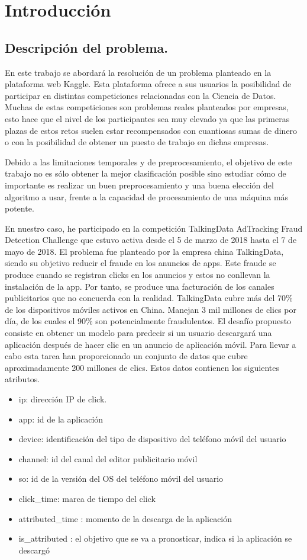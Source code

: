 \chapter[Introducción]{Introducción}
\section{Descripción del problema.}
En este trabajo se abordará la resolución de un problema planteado en la plataforma web Kaggle. Esta plataforma ofrece a sus usuarios la posibilidad de participar en distintas competiciones relacionadas con la Ciencia de Datos. Muchas de estas competiciones son problemas reales planteados por empresas, esto hace que el nivel de los participantes sea muy elevado ya que las primeras plazas de estos retos suelen estar recompensados con cuantiosas sumas de dinero o con la posibilidad de obtener un puesto de trabajo en dichas empresas.

Debido a las limitaciones temporales y de preprocesamiento, el objetivo de este trabajo no es sólo obtener la mejor clasificación posible sino estudiar cómo de importante es realizar un buen preprocesamiento y una buena elección del algoritmo a usar, frente a la capacidad de procesamiento de una máquina más potente.

En nuestro caso, he participado en la competición TalkingData AdTracking Fraud Detection Challenge que estuvo activa desde el 5 de marzo de 2018 hasta el 7 de mayo de 2018. El problema fue planteado por la empresa china TalkingData, siendo su objetivo reducir el fraude en los anuncios de apps. Este fraude se produce cuando se registran clicks en los anuncios y estos no conllevan la instalación de la app. Por tanto, se produce una facturación de los canales publicitarios que no concuerda con la realidad.
TalkingData	cubre más del 70\% de los dispositivos móviles activos en China. Manejan 3 mil millones de clics por día, de los cuales el 90\% son potencialmente fraudulentos. El desafío propuesto consiste en obtener un modelo para predecir si un usuario descargará una aplicación después de hacer clic en un anuncio de aplicación móvil.
\newpage
Para llevar a cabo esta tarea han proporcionado un conjunto de datos que cubre aproximadamente 200 millones de clics. Estos datos contienen los siguientes atributos.

\begin{itemize}
	
	\item ip: dirección IP de click.
	\item app: id de la aplicación
	\item device: identificación del tipo de dispositivo del teléfono móvil del usuario
	\item channel: id del canal del editor publicitario móvil
	\item so: id de la versión del OS del teléfono móvil del usuario
	\item click\_time: marca de tiempo del click 
	\item attributed\_time : momento de la descarga de la aplicación 
	\item is\_attributed : el objetivo que se va a pronosticar, indica si la aplicación se descargó
\end{itemize}

